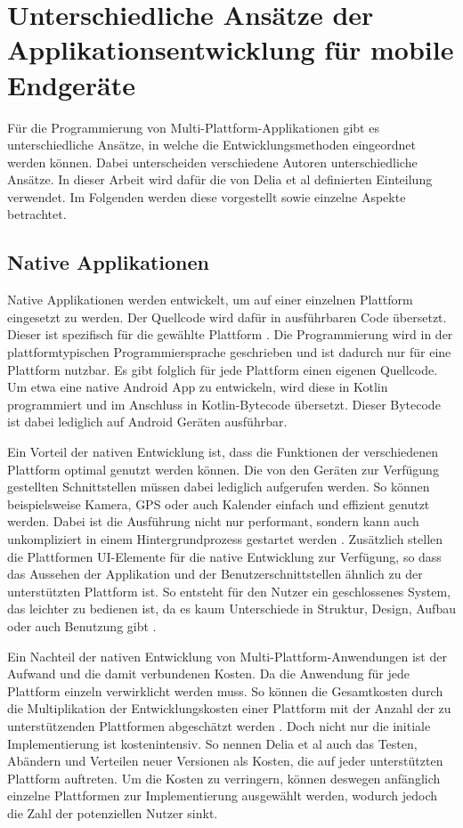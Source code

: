 \section{Unterschiedliche Ansätze der Applikationsentwicklung für mobile Endgeräte}
\label{cha:3_2}
Für die Programmierung von Multi-Plattform-Applikationen gibt es unterschiedliche Ansätze, in welche die Entwicklungsmethoden eingeordnet werden können. Dabei unterscheiden verschiedene Autoren unterschiedliche Ansätze. In dieser Arbeit wird dafür die von Delia et al \cite{IEEE_development_classes} definierten Einteilung verwendet. Im Folgenden werden diese vorgestellt sowie einzelne Aspekte betrachtet.

\subsection{Native Applikationen}
Native Applikationen werden entwickelt, um auf einer einzelnen Plattform eingesetzt zu werden. Der Quellcode wird dafür in ausführbaren Code übersetzt. Dieser ist spezifisch für die gewählte Plattform \cite{IEEE_development_classes}.
Die Programmierung wird in der plattformtypischen Programmiersprache geschrieben und ist dadurch nur für eine Plattform nutzbar. Es gibt folglich für jede Plattform einen eigenen Quellcode. Um etwa eine native Android App zu entwickeln, wird diese in Kotlin programmiert und im Anschluss in Kotlin-Bytecode übersetzt. Dieser Bytecode ist dabei lediglich auf Android Geräten ausführbar.

Ein Vorteil der nativen Entwicklung ist, dass die Funktionen der verschiedenen Plattform optimal genutzt werden können. Die von den Geräten zur Verfügung gestellten Schnittstellen müssen dabei lediglich aufgerufen werden. So können beispielsweise Kamera, GPS oder auch Kalender einfach und effizient genutzt werden. Dabei ist die Ausführung nicht nur performant, sondern kann auch unkompliziert in einem Hintergrundprozess gestartet werden \cite{IEEE_development_classes}.
Zusätzlich stellen die Plattformen UI-Elemente für die native Entwicklung zur Verfügung, so dass das Aussehen der Applikation und der Benutzerschnittstellen ähnlich zu der unterstützten Plattform ist. So entsteht für den Nutzer ein geschlossenes System, das leichter zu bedienen ist, da es kaum Unterschiede in Struktur, Design, Aufbau oder auch Benutzung gibt \cite{IEEE_Khackouch_Al}.

Ein Nachteil der nativen Entwicklung von Multi-Plattform-Anwendungen ist der Aufwand und die damit verbundenen Kosten. Da die Anwendung für jede Plattform einzeln verwirklicht werden muss. So können die Gesamtkosten durch die Multiplikation der Entwicklungskosten einer Plattform mit der Anzahl der zu unterstützenden Plattformen abgeschätzt werden \cite{IEEE_Khackouch_Al}. Doch nicht nur die initiale Implementierung ist kostenintensiv. So nennen Delia et al \cite{IEEE_development_classes} auch das Testen, Abändern und Verteilen neuer Versionen als Kosten, die auf jeder unterstützten Plattform auftreten. 
Um die Kosten zu verringern, können deswegen anfänglich einzelne Plattformen zur Implementierung ausgewählt werden, wodurch jedoch die Zahl der potenziellen Nutzer sinkt.

